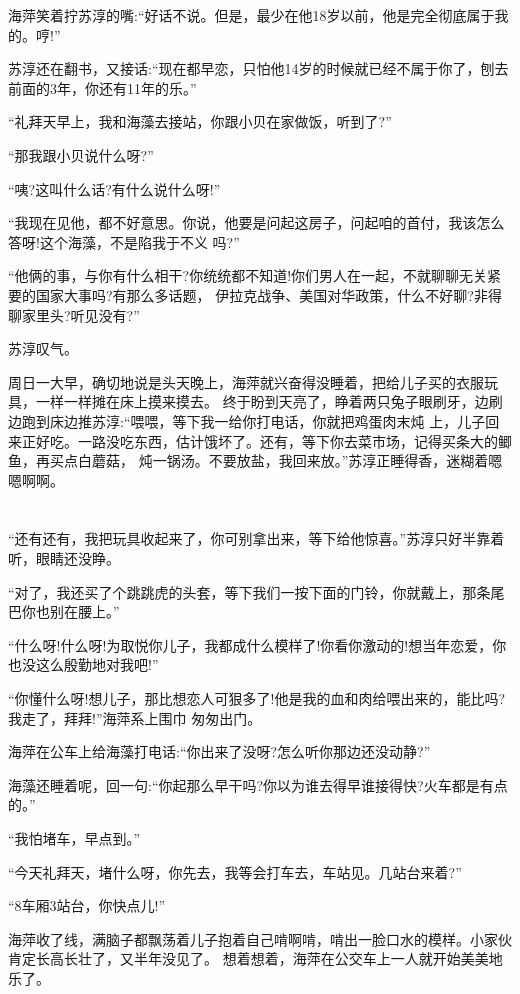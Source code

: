 \documentclass[11pt,a4paper,onecolumn]{article}
\begin{document}
海萍笑着拧苏淳的嘴:``好话不说。但是，最少在他18岁以前，他是完全彻底属于我的。哼!''

苏淳还在翻书，又接话:``现在都早恋，只怕他14岁的时候就已经不属于你了，刨去前面的3年，你还有11年的乐。''

``礼拜天早上，我和海藻去接站，你跟小贝在家做饭，听到了?''

``那我跟小贝说什么呀?''

``咦?这叫什么话?有什么说什么呀!''

``我现在见他，都不好意思。你说，他要是问起这房子，问起咱的首付，我该怎么答呀!这个海藻，不是陷我于不义
吗?''

``他俩的事，与你有什么相干?你统统都不知道!你们男人在一起，不就聊聊无关紧要的国家大事吗?有那么多话题，
伊拉克战争、美国对华政策，什么不好聊?非得聊家里头?听见没有?''

苏淳叹气。

周日一大早，确切地说是头天晚上，海萍就兴奋得没睡着，把给儿子买的衣服玩具，一样一样摊在床上摸来摸去。
终于盼到天亮了，睁着两只兔子眼刷牙，边刷边跑到床边推苏淳:``喂喂，等下我一给你打电话，你就把鸡蛋肉末炖
上，儿子回来正好吃。一路没吃东西，估计饿坏了。还有，等下你去菜市场，记得买条大的鲫鱼，再买点白蘑菇，
炖一锅汤。不要放盐，我回来放。''苏淳正睡得香，迷糊着嗯嗯啊啊。

\section[\thesection]{}

``还有还有，我把玩具收起来了，你可别拿出来，等下给他惊喜。''苏淳只好半靠着听，眼睛还没睁。

``对了，我还买了个跳跳虎的头套，等下我们一按下面的门铃，你就戴上，那条尾巴你也别在腰上。''

``什么呀!什么呀!为取悦你儿子，我都成什么模样了!你看你激动的!想当年恋爱，你也没这么殷勤地对我吧!''

``你懂什么呀!想儿子，那比想恋人可狠多了!他是我的血和肉给喂出来的，能比吗?我走了，拜拜!''海萍系上围巾
匆匆出门。

海萍在公车上给海藻打电话:``你出来了没呀?怎么听你那边还没动静?''

海藻还睡着呢，回一句:``你起那么早干吗?你以为谁去得早谁接得快?火车都是有点的。''

``我怕堵车，早点到。''

``今天礼拜天，堵什么呀，你先去，我等会打车去，车站见。几站台来着?''

``8车厢3站台，你快点儿!''

海萍收了线，满脑子都飘荡着儿子抱着自己啃啊啃，啃出一脸口水的模样。小家伙肯定长高长壮了，又半年没见了。
想着想着，海萍在公交车上一人就开始美美地乐了。
\end{document}
